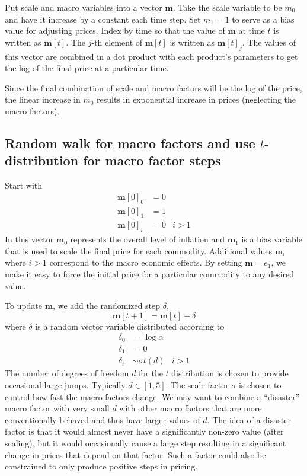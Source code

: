 \documentclass[11pt]{article}
\begin{document}
Put scale and macro variables into a vector $\mathbf m$. Take the scale variable to be $m_0$ and have it increase by a constant each time step.  Set $m_1=1$ to serve as a bias value for adjusting prices. Index by time so that the value of $\mathbf m$ at time $t$ is written as $\mathbf m[t]$. The $j$-th element of $\mathbf m[t]$ is written as $\mathbf m[t]_j$. The values of this vector are combined in a dot product with each product's parameters to get the log of the final price at a particular time.

Since the final combination of scale and macro factors will be the log of the price, the linear increase in $m_0$ results in exponential increase in prices (neglecting the macro factors).
\subsection{Random walk for macro factors and use $t$-distribution for macro factor steps}
Start with 
\begin{align*}
\mathbf m[0]_0 &= 0 \\
\mathbf m[0]_1 &= 1 \\
\mathbf m[0]_i &= 0 & i > 1
\end{align*}
In this vector $\mathbf m_0$ represents the overall level of inflation and $\mathbf m_1$ is a bias variable that is used to scale the final price for each commodity. Additional values $\mathbf m_i$ where $i>1$ correspond to the macro economic effects. By setting $\mathbf m = e_1$, we make it easy to force the initial price for a particular commodity to any desired value.

To update $\mathbf m$, we add the randomized step $\delta$,
\[
\mathbf m[t+1] = \mathbf m[t] + \delta
\]
where $\delta$ is a random vector variable distributed according to
\begin{align*}
\delta_0 &= \log \alpha \\
\delta_1 &= 0 \\
\delta_i &\sim \sigma t(d) & i > 1
\end{align*}
The number of degrees of freedom $d$ for the $t$ distribution is chosen to provide occasional large jumps. Typically $d \in [1,5]$. The scale factor $\sigma$ is chosen to control how fast the macro factors change. We may want to combine a ``disaster'' macro factor with very small $d$ with other macro factors that are more conventionally behaved and thus have larger values of $d$. The idea of a disaster factor is that it would almost never have a significantly non-zero value (after scaling), but it would occasionally cause a large step resulting in a significant change in prices that depend on that factor. Such a factor could also be constrained to only produce positive steps in pricing.
\end{document}
